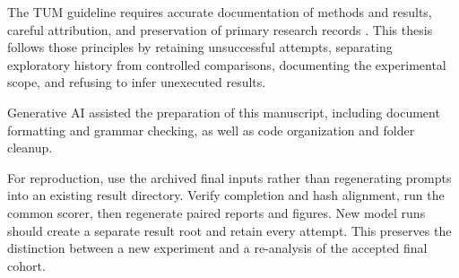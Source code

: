 The TUM guideline requires accurate documentation of methods and results, careful attribution, and preservation of primary research records \citep{technicaluniversityofmunich2015}. This thesis follows those principles by retaining unsuccessful attempts, separating exploratory history from controlled comparisons, documenting the experimental scope, and refusing to infer unexecuted results.


Generative AI assisted the preparation of this manuscript, including document formatting and grammar checking, as well as code organization and folder cleanup.


For reproduction, use the archived final inputs rather than regenerating prompts into an existing result directory. Verify completion and hash alignment, run the common scorer, then regenerate paired reports and figures. New model runs should create a separate result root and retain every attempt. This preserves the distinction between a new experiment and a re-analysis of the accepted final cohort.

